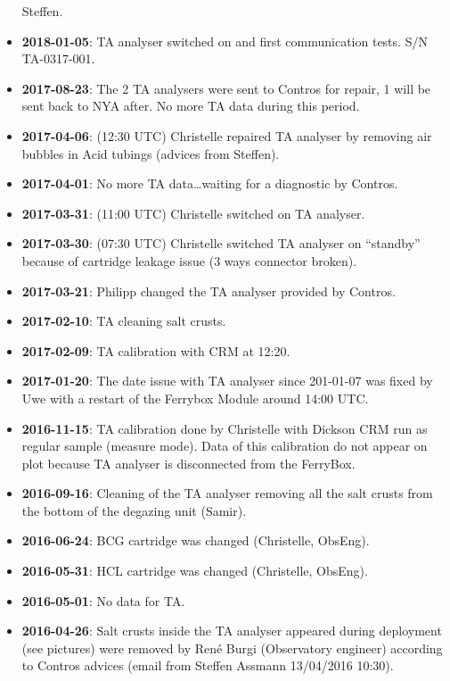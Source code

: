 \documentclass[
]{article}
\begin{document}
\begin{itemize}
  Steffen.
\item
  \textbf{2018-01-05}: TA analyser switched on and first communication
  tests. S/N TA-0317-001.
\item
  \textbf{2017-08-23}: The 2 TA analysers were sent to Contros for
  repair, 1 will be sent back to NYA after. No more TA data during this
  period.
\item
  \textbf{2017-04-06}: (12:30 UTC) Christelle repaired TA analyser by
  removing air bubbles in Acid tubings (advices from Steffen).
\item
  \textbf{2017-04-01}: No more TA data\ldots waiting for a diagnostic by
  Contros.
\item
  \textbf{2017-03-31}: (11:00 UTC) Christelle switched on TA analyser.
\item
  \textbf{2017-03-30}: (07:30 UTC) Christelle switched TA analyser on
  ``standby'' because of cartridge leakage issue (3 ways connector
  broken).
\item
  \textbf{2017-03-21}: Philipp changed the TA analyser provided by
  Contros.
\item
  \textbf{2017-02-10}: TA cleaning salt crusts.
\item
  \textbf{2017-02-09}: TA calibration with CRM at 12:20.
\item
  \textbf{2017-01-20}: The date issue with TA analyser since 201-01-07
  was fixed by Uwe with a restart of the Ferrybox Module around 14:00
  UTC.
\item
  \textbf{2016-11-15}: TA calibration done by Christelle with Dickson
  CRM run as regular sample (measure mode). Data of this calibration do
  not appear on plot because TA analyser is disconnected from the
  FerryBox.
\item
  \textbf{2016-09-16}: Cleaning of the TA analyser removing all the salt
  crusts from the bottom of the degazing unit (Samir).
\item
  \textbf{2016-06-24}: BCG cartridge was changed (Christelle, ObsEng).
\item
  \textbf{2016-05-31}: HCL cartridge was changed (Christelle, ObsEng).
\item
  \textbf{2016-05-01}: No data for TA.
\item
  \textbf{2016-04-26}: Salt crusts inside the TA analyser appeared
  during deployment (see pictures) were removed by René Burgi
  (Observatory engineer) according to Contros advices (email from
  Steffen Assmann 13/04/2016 10:30).
\end{itemize}
\end{document}
